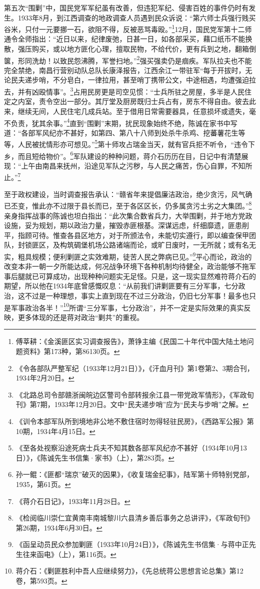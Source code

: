 第五次“围剿”中，国民党军军纪虽有改善，但违犯军纪、侵害百姓的事件仍时有发生。1933年8月，到江西调查的地政调查人员遇到民众诉说：“第六师士兵强行贱买谷米，只付一元要挪一石，欲阻不得，反被恶骂毒殴。”\footnote{傅莘耕：《金溪匪区实习调查报告》，萧铮主编《民国二十年代中国大陆土地问题资料》第173种，第86130页。}12月，国民党军第十二师通令全师指出：“近日以来，纪律废弛，日甚一日，如各部采买，藉口纸币不能换散，强压购买，或以地方匪化心理，擅取民物，不给代价，更有兵到之地，翻箱倒箧，形同洗劫！以致民怨沸腾，军誉扫地。”\footnote{《令各部队严整军纪（1933年12月21日）》，《汗血月刊》第1卷第2、3期合刊，1934年2月20日。}强买强卖仍是痼疾。军队拉夫也不能完全禁绝，南昌行营别动队总队长康泽报告，江西余江一带驻军“每于开拔时，无论民夫递步哨，不分皂白，一律拉用，甚至哨丁携带公文，中途相遇，均遭强迫拉去，并有凶殴情事”。\footnote{《北路总司令部赣浙闽皖边区警司令部转报余江县一带党政军情形》，《军政旬刊》第7期，1933年12月20日。文中“民夫递步哨”应为“民夫与步哨”之解。}占用民房更是司空见惯：“士兵所驻之房屋，多半是人民住定之内室，责令空出一部分。其厅堂及厨房既归士兵占有，房东不得自由。彼去此来，继续无间，人民住宅几成兵站。至于借用日常需要器具，任意损坏或遗失，毫不负责，犹其余事。”\footnote{《训令本部军队所到境地非公地不敷住宿时勿得轻驻民房》，《西路军公报》第10期，1934年4月15日。}直到“围剿”末期，扰民现象始终不绝，陈诚在家书中写道：“各部军风纪亦不甚好，如第四、第八十八师到处杀牛杀鸡、挖蕃薯花生等等，人民被扰情形亦可想见。”\footnote{《至各处视察沿途死病士兵夫不知其数各部军风纪亦不甚好（1934年10月13日）》，《陈诚先生书信集·家书》（上），第283页。}第十师攻占瑞金当天，就有官兵拒不听令，“违令下乡，而且短给物价”。\footnote{孙一鲲：《匪都“瑞京”破灭的因果》，《收复瑞金纪事》，陆军第十师特别党部，1935，第61页。}军队建设的种种问题，蒋介石历历在目，日记中有清楚展现：“上午由南昌来抚州，沿途见军队之污秽，与人民之痛苦，伤心自罪，不知所止。”\footnote{《蒋介石日记》，1933年11月28日。}


至于政权建设，当时调查报告承认：“赣省年来提倡廉洁政治，绝少贪污，风气确已丕变，惟此亦不过限于县长而已，至于各区区长，仍多属贪污土劣之大集团。”\footnote{《检阅临川崇仁宜黄南丰南城黎川六县清乡善后事务之总讲评》，《军政旬刊》第26期，1934年6月30日。}亲身指挥战事的陈诚也坦白指出：“此次集合数省兵力，大举围剿，并于地方党政设施，妥为规划，期以政治力量，摧毁赤匪根基。深谋远虑，纤细靡遗，匪患削平，指顾可待。惟查各县区地方，对于所颁法令，未能切实遵行，即以编查保甲团队，封锁匪区，及构筑碉堡机场公路诸端而论，或旷日废时，一无所就；或有名无实，粗具规模；便利剿匪之实效难期，徒苦人民之弊病已见。”\footnote{《函呈动员民众参加剿匪（1933年10月24日）》，《陈诚先生书信集·与蒋中正先生往来函电》（上），第116页。}平心而论，政治的改变本非一朝一夕所能达成，何况战争环境下各种机制均待健全，政治能够不拖军事后腿就已可算成功，出现种种问题实无足怪。只是，这一现实显然难符蒋介石的期望，所以他在1934年底曾感慨叹息：“从前我们讲剿匪要有三分军事，七分政治，这不过是一种理想，事实上直到现在不过三分政治，仍旧七分军事！最多也只是军事政治各半！”\footnote{蒋介石：《剿匪胜利中吾人应继续努力》，《先总统蒋公思想言论总集》第12卷，第593页。}所谓“三分军事，七分政治”，并不一定是实际效果的真实反映，更多体现的还是蒋对政治“剿共”的重视。

